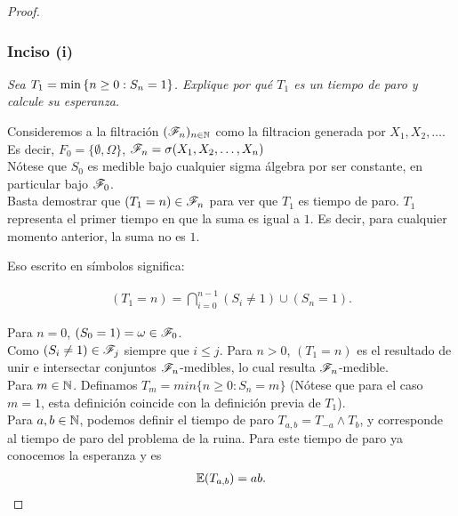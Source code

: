 \begin{proof}
	\subsubsection{Inciso (i)}
	\emph
	{
		Sea ${T_1=\min\left\{ n\geq 0:S_n=1\right\} }$. Explique por qu\'e ${T_1}$ es un 
		tiempo de paro y calcule su esperanza.\\
	}
	
		Consideremos a la filtración ${(\mathscr{F}_n)_{n\in\mathbb{N}}}$ como la filtracion 
		generada por ${X_1, X_2, \dots}$.\\

		Es decir, ${F_0 = \{\emptyset, \Omega\}}$, ${\mathscr{F}_n = \sigma(X_1, X_2, \dots, X_n)}$\\
	
		Nótese que ${S_0}$ es medible bajo cualquier sigma álgebra por ser constante, en particular bajo
		${\mathscr{F}_0}$.\\
	
		Basta demostrar que ${(T_1 = n) \in \mathscr{F}_n}$ para ver que ${T_1}$ es tiempo de paro. ${T_1}$ 
		representa el primer tiempo en que la suma es igual a ${1}$. Es decir, para cualquier 
		momento anterior, la suma no es ${1}$.
	
		Eso escrito en símbolos significa:
	
		\begin{align}
			(T_1 = n) = \bigcap_{i=0}^{n-1}(S_i \not= 1) \cup (S_n = 1).
		\end{align}
	
		Para ${n=0}$, ${(S_0 = 1) = \omega \in \mathscr{F}_0}$. \\
	
		Como ${(S_i \not= 1) \in \mathscr{F}_j}$ siempre que ${i \leq j}$. Para ${n>0}$, ${(T_1 = n)}$ es el resultado de 
		unir e intersectar conjuntos ${\mathscr{F}_n}$-medibles, lo cual resulta ${\mathscr{F}_n}$-medible.\\
	
		Para ${m \in \mathbb{N}}$. Definamos ${T_m = min\{n \geq 0 : S_n = m\}}$ 
		(Nótese que para el caso ${m=1}$, esta definición	coincide con la definición previa de ${T_1}$).\\
		
		Para ${a,b \in \mathbb{N}}$, podemos definir el tiempo de paro ${T_{a,b} = T_{-a} \wedge T_b}$, y 
		corresponde al 	tiempo de paro del problema de la ruina. Para este tiempo de paro ya conocemos 
		la esperanza y es
		\begin{align}
			\mathbb{E}(T_{a,b}) = ab.
		\end{align}
		

\end{proof}

